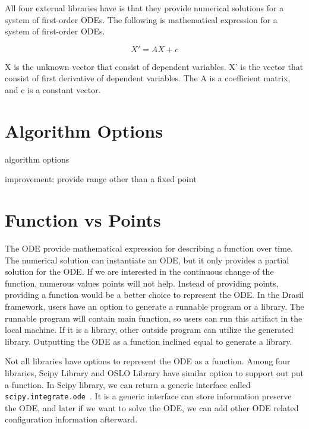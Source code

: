 All four external libraries have is that they provide numerical solutions for a system of first-order ODEs. The following is mathematical expression for a system of first-order ODEs. 

\begin{equation} \label{eq_foode}
    X' = AX + c
\end{equation}

X is the unknown vector that consist of dependent variables. X' is the vector that consist of first derivative of dependent variables. The A is a coefficient matrix, and c is a constant vector. 


\section{Algorithm Options}
algorithm options

improvement: provide range other than a fixed point 

\section{Function vs Points}
The ODE provide mathematical expression for describing a function over time. The numerical solution can instantiate an ODE, but it only provides a partial solution for the ODE. If we are interested in the continuous change of the function, numerous values points will not help. Instead of providing points, providing a function would be a better choice to represent the ODE. In the Drasil framework, users have an option to generate a runnable program or a library. The runnable program will contain main function, so users can run this artifact in the local machine. If it is a library, other outside program can utilize the generated library. Outputting the ODE as a function inclined equal to generate a library.

Not all libraries have options to represent the ODE as a function. Among four libraries, Scipy Library and OSLO Library have similar option to support out put a function. In Scipy library, we can return a generic interface called \verb|scipy.integrate.ode|~\citep{scipyfun}. It is a generic interface can store information preserve the ODE, and later if we want to solve the ODE, we can add other ODE related configuration information afterward.


